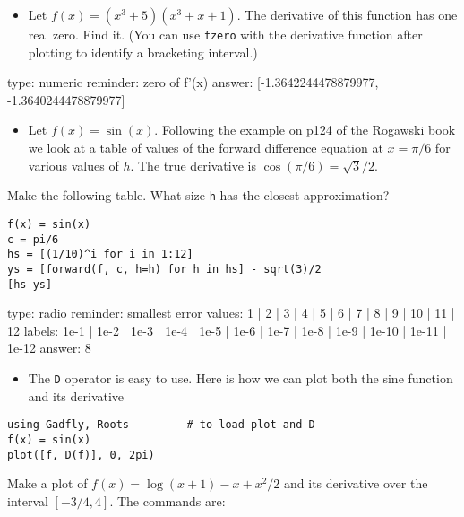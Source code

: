 \documentclass[12pt]{article}
\begin{document}
\begin{itemize}
\itemsep1pt\parskip0pt
\item
  Let $f(x) = (x^3 + 5)(x^3 + x + 1)$. The derivative of this function
  has one real zero. Find it. (You can use \texttt{fzero} with the
  derivative function after plotting to identify a bracketing interval.)
\end{itemize}

\begin{answer}
    type: numeric
    reminder: zero of f'(x)
    answer: [-1.3642244478879977, -1.3640244478879977]

\end{answer}

\begin{itemize}
\itemsep1pt\parskip0pt
\item
  Let $f(x) = \sin(x)$. Following the example on p124 of the Rogawski
  book we look at a table of values of the forward difference equation
  at $x=\pi/6$ for various values of $h$. The true derivative is
  $\cos(\pi/6) = \sqrt{3}/2$.
\end{itemize}

Make the following table. What size \texttt{h} has the closest
approximation?



\begin{verbatim}
f(x) = sin(x)
c = pi/6
hs = [(1/10)^i for i in 1:12]
ys = [forward(f, c, h=h) for h in hs] - sqrt(3)/2
[hs ys]
\end{verbatim}
\begin{answer}
type: radio
reminder: smallest error
values: 1 | 2 | 3 | 4 | 5 | 6 | 7 | 8 | 9 | 10 | 11 | 12
labels: 1e-1 | 1e-2 | 1e-3 | 1e-4 | 1e-5 | 1e-6 | 1e-7 | 1e-8 | 1e-9 | 1e-10 | 1e-11 | 1e-12
answer: 8
\end{answer}

\begin{itemize}
\itemsep1pt\parskip0pt
\item
  The \texttt{D} operator is easy to use. Here is how we can plot both
  the sine function and its derivative
\end{itemize}



\begin{verbatim}
using Gadfly, Roots         # to load plot and D
f(x) = sin(x)
plot([f, D(f)], 0, 2pi)
\end{verbatim}
Make a plot of $f(x) = \log(x+1) - x + x^2/2$ and its derivative over
the interval $[-3/4, 4]$. The commands are:
\end{document}
